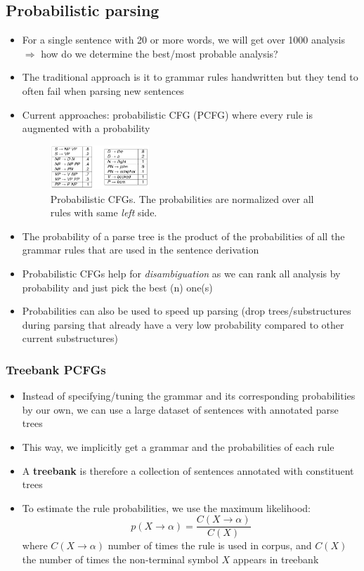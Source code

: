 \subsection{Probabilistic parsing}
\begin{itemize}
	\item For a single sentence with 20 or more words, we will get over 1000 analysis $\Rightarrow$ how do we determine the best/most probable analysis?
	\item The traditional approach is it to grammar rules handwritten but they tend to often fail when parsing new sentences
	\item  Current approaches: probabilistic CFG (PCFG) where every rule is augmented with a probability
	\begin{figure}[ht]
		\centering
		\includegraphics[width=0.35\textwidth]{figures/chart_parsing_prob_cfg.png}
		\caption{Probabilistic CFGs. The probabilities are normalized over all rules with same \textit{left} side.}
		\label{fig:probabilistic_cfg}
	\end{figure}
	\item The probability of a parse tree is the product of the probabilities of all the grammar rules that are used in the sentence derivation
	\item Probabilistic CFGs help for \textit{disambiguation} as we can rank all analysis by probability and just pick the best (n) one(s)
	\item Probabilities can also be used to speed up parsing (drop trees/substructures during parsing that already have a very low probability compared to other current substructures)
\end{itemize}
\subsubsection{Treebank PCFGs}
\begin{itemize}
	\item Instead of specifying/tuning the grammar and its corresponding probabilities by our own, we can use a large dataset of sentences with annotated parse trees
	\item This way, we implicitly get a grammar and the probabilities of each rule
	\item A \textbf{treebank} is therefore a collection of sentences annotated with constituent trees
	\item To estimate the rule probabilities, we use the maximum likelihood:
	$$p(X\to \alpha) = \frac{C(X\to \alpha )}{C(X)}$$
	where $C(X\to \alpha)$ number of times the rule is used in corpus, and $C(X)$ the number of times the non-terminal symbol $X$ appears in treebank
\end{itemize}
